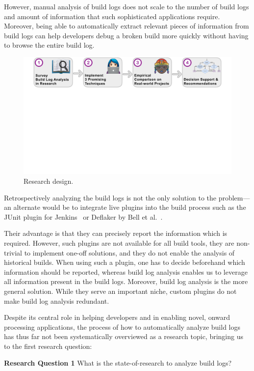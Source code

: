 However, manual analysis of build logs does not
scale to the number of build logs and amount of information that such
sophisticated applications require.
Moreover, being able to
automatically extract relevant pieces of information from build logs
can help
developers debug a broken build more quickly without having to browse
the entire build log.

\begin{figure}[htb]
	\centering
	\includegraphics[width=\textwidth, trim={1.2cm 10.5cm 1.2cm 0cm},
	clip]{img/overview.pdf}
	\caption{Research design.}
	\label{fig:overview}
\end{figure}

Retrospectively analyzing the build logs is not the only solution to
the problem---an alternate would be to integrate live plugins into the
build process
 such as the JUnit
plugin for Jenkins~\cite{jenkins2020junit-plugin} or
Deflaker by Bell et al.~\cite{bell2018deflaker}.

Their advantage is that they can precisely report the information which
is required.
However, such plugins are not available for all build tools, they are
non-trivial to implement one-off solutions, and they
do not enable the analysis of historical builds.
When using such a plugin, one has to decide
beforehand which information should be reported, whereas
build log analysis enables us to leverage all information
present in the build logs.
Moreover, build log analysis is the more general solution.
While they serve an important niche, custom plugins do not make build
log analysis redundant.

Despite its central role in helping developers and in enabling
novel, onward processing applications,
the process of how to
automatically
analyze build logs has thus far not been systematically
overviewed as a research topic, bringing us to the first
research question:
\begin{simplebox}[minipage boxed title*=-5cm]{\textbf{Research Question
1}}
What is the state-of-research to analyze build logs?
\end{simplebox}

